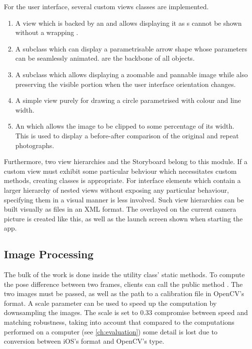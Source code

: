 For the user interface, several custom views classes are implemented.
\begin{enumerate}
   \item {} A view which is backed by an  and
      allows displaying it as s cannot be shown without a
      wrapping .
   \item {} A  subclass which can display a
      parametrisable arrow shape whose parameters can be seamlessly animated.
       are the backbone of all  objects.
   \item {} A  subclass which allows
      displaying a zoomable and pannable image while also preserving the visible
      portion when the user interface orientation changes.
   \item {} A simple view purely for drawing a circle parametrised
      with colour and line width.
   \item {} An  which allows the
      image to be clipped to some percentage of its width. This is used to
      display a before-after comparison of the original and repeat photographs.
\end{enumerate}

Furthermore, two view hierarchies and the Storyboard belong to this module.  If
a custom view must exhibit some particular behviour which necessitates custom
methods, creating classes is appropriate. For interface elements which contain a
larger hierarchy of nested views without exposing any particular behaviour,
specifying them in a visual manner is less involved. Such view hierarchies can
be built visually as  files in an XML format. The
 overlayed on the current camera picture is created like
this, as well as the launch screen shown when starting the app.


\subsection{Image Processing}

The bulk of the work is done inside the utility class'  static
methods. To compute the pose difference between two frames, clients can call the
public method
.
The two images must be passed, as well as the path to a calibration file in
OpenCV's  format. A scale parameter can be used to speed up
the computation by downsampling the images.  The scale is set to $0.33$
compromise between speed and matching robustness, taking into account that
compared to the computations performed on a computer (see
\autoref{ch:evaluation}) some detail is lost due to conversion between iOS's
 format and OpenCV's  type.

